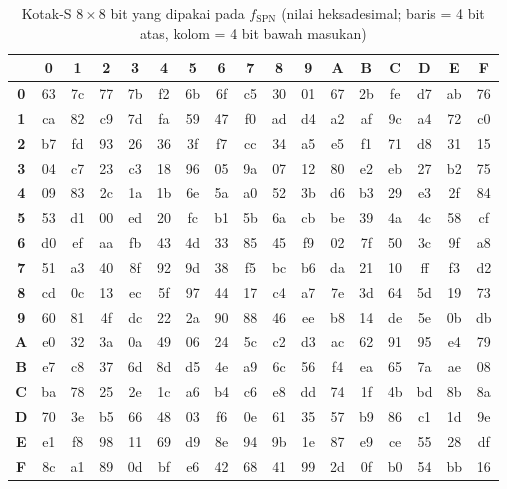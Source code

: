 \begin{table}[H]
    \centering
    \caption{Kotak-S $8 \times 8$ bit yang dipakai pada $f_{\text{SPN}}$ (nilai heksadesimal; baris = 4 bit atas, kolom = 4 bit bawah masukan)}
    \label{tab:sbox}
    \footnotesize
    \setlength{\tabcolsep}{4.2pt}
    \ttfamily
    \begin{tabular}{c|cccccccccccccccc}
        \toprule
        & \textbf{0} & \textbf{1} & \textbf{2} & \textbf{3} & \textbf{4} & \textbf{5} & \textbf{6} & \textbf{7} & \textbf{8} & \textbf{9} & \textbf{A} & \textbf{B} & \textbf{C} & \textbf{D} & \textbf{E} & \textbf{F} \\
        \midrule
        \textbf{0} & 63 & 7c & 77 & 7b & f2 & 6b & 6f & c5 & 30 & 01 & 67 & 2b & fe & d7 & ab & 76 \\
        \textbf{1} & ca & 82 & c9 & 7d & fa & 59 & 47 & f0 & ad & d4 & a2 & af & 9c & a4 & 72 & c0 \\
        \textbf{2} & b7 & fd & 93 & 26 & 36 & 3f & f7 & cc & 34 & a5 & e5 & f1 & 71 & d8 & 31 & 15 \\
        \textbf{3} & 04 & c7 & 23 & c3 & 18 & 96 & 05 & 9a & 07 & 12 & 80 & e2 & eb & 27 & b2 & 75 \\
        \textbf{4} & 09 & 83 & 2c & 1a & 1b & 6e & 5a & a0 & 52 & 3b & d6 & b3 & 29 & e3 & 2f & 84 \\
        \textbf{5} & 53 & d1 & 00 & ed & 20 & fc & b1 & 5b & 6a & cb & be & 39 & 4a & 4c & 58 & cf \\
        \textbf{6} & d0 & ef & aa & fb & 43 & 4d & 33 & 85 & 45 & f9 & 02 & 7f & 50 & 3c & 9f & a8 \\
        \textbf{7} & 51 & a3 & 40 & 8f & 92 & 9d & 38 & f5 & bc & b6 & da & 21 & 10 & ff & f3 & d2 \\
        \textbf{8} & cd & 0c & 13 & ec & 5f & 97 & 44 & 17 & c4 & a7 & 7e & 3d & 64 & 5d & 19 & 73 \\
        \textbf{9} & 60 & 81 & 4f & dc & 22 & 2a & 90 & 88 & 46 & ee & b8 & 14 & de & 5e & 0b & db \\
        \textbf{A} & e0 & 32 & 3a & 0a & 49 & 06 & 24 & 5c & c2 & d3 & ac & 62 & 91 & 95 & e4 & 79 \\
        \textbf{B} & e7 & c8 & 37 & 6d & 8d & d5 & 4e & a9 & 6c & 56 & f4 & ea & 65 & 7a & ae & 08 \\
        \textbf{C} & ba & 78 & 25 & 2e & 1c & a6 & b4 & c6 & e8 & dd & 74 & 1f & 4b & bd & 8b & 8a \\
        \textbf{D} & 70 & 3e & b5 & 66 & 48 & 03 & f6 & 0e & 61 & 35 & 57 & b9 & 86 & c1 & 1d & 9e \\
        \textbf{E} & e1 & f8 & 98 & 11 & 69 & d9 & 8e & 94 & 9b & 1e & 87 & e9 & ce & 55 & 28 & df \\
        \textbf{F} & 8c & a1 & 89 & 0d & bf & e6 & 42 & 68 & 41 & 99 & 2d & 0f & b0 & 54 & bb & 16 \\
        \bottomrule
    \end{tabular}
\end{table}

